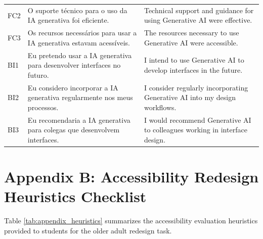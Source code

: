 \documentclass{cleiej}
\begin{document}
\begin{table}[ht]
\begin{tabularx}{\textwidth}{l p{7.5cm} X}
FC2 & O suporte técnico para o uso da IA generativa foi eficiente. & Technical support and guidance for using Generative AI were effective. \\
FC3 & Os recursos necessários para usar a IA generativa estavam acessíveis. & The resources necessary to use Generative AI were accessible. \\
\midrule
BI1 & Eu pretendo usar a IA generativa para desenvolver interfaces no futuro. & I intend to use Generative AI to develop interfaces in the future. \\
BI2 & Eu considero incorporar a IA generativa regularmente nos meus processos. & I consider regularly incorporating Generative AI into my design workflows. \\
BI3 & Eu recomendaria a IA generativa para colegas que desenvolvem interfaces. & I would recommend Generative AI to colleagues working in interface design. \\
\bottomrule
\end{tabularx}
\end{table}

\section*{Appendix B: Accessibility Redesign Heuristics Checklist}
Table \ref{tab:appendix_heuristics} summarizes the accessibility evaluation heuristics provided to students for the older adult redesign task.
\end{document}
